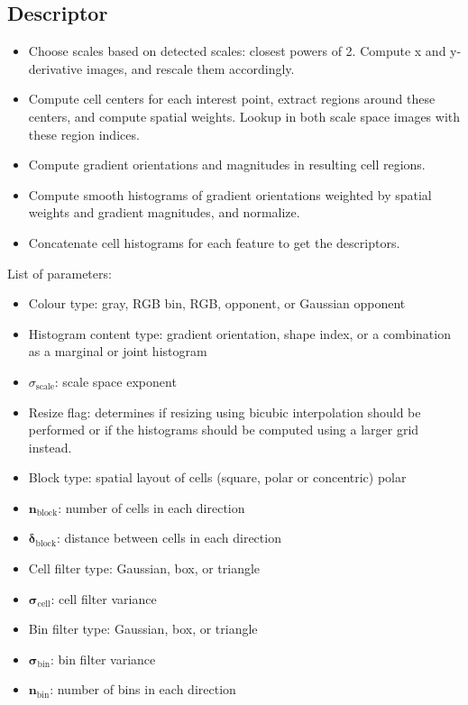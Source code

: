 \documentclass[thesis.tex]{subfiles}
\begin{document}
\subsection{Descriptor}
%
\begin{itemize}
\item Choose scales based on detected scales: closest powers of 2. Compute x and y-derivative images, and rescale them accordingly.
\item Compute cell centers for each interest point, extract regions around these centers, and compute spatial weights. Lookup in both scale space images with these region indices.
\item Compute gradient orientations and magnitudes in resulting cell regions.
\item Compute smooth histograms of gradient orientations weighted by spatial weights and gradient magnitudes, and normalize.
\item Concatenate cell histograms for each feature to get the descriptors.
\end{itemize}
%
List of parameters:
%
\begin{itemize}
\item Colour type: gray, RGB bin, RGB, opponent, or Gaussian opponent
\item Histogram content type: gradient orientation, shape index, or a combination as a marginal or joint histogram
\item $\sigma_{\text{scale}}$: scale space exponent
\item Resize flag: determines if resizing using bicubic interpolation should be performed or if the histograms should be computed using a larger grid instead.
\item Block type: spatial layout of cells (square, polar or concentric)
polar
\item $\mathbf{n}_{\text{block}}$: number of cells in each direction
\item $\boldsymbol\delta_{\text{block}}$: distance between cells in each direction
\item Cell filter type: Gaussian, box, or triangle
\item $\boldsymbol\sigma_{\text{cell}}$: cell filter variance
\item Bin filter type: Gaussian, box, or triangle
\item $\boldsymbol\sigma_{\text{bin}}$: bin filter variance
\item $\mathbf{n}_\text{bin}$: number of bins in each direction
\end{itemize}
\end{document}
